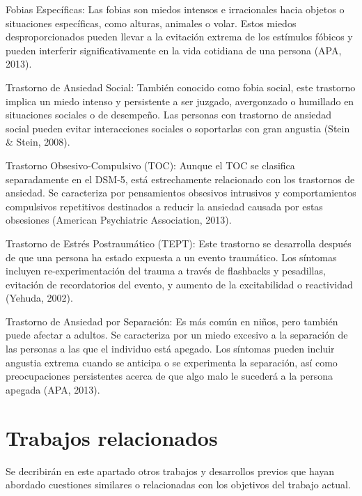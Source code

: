Fobias Específicas: Las fobias son miedos intensos e irracionales hacia objetos o situaciones específicas, como alturas, animales o volar. Estos miedos desproporcionados pueden llevar a la evitación extrema de los estímulos fóbicos y pueden interferir significativamente en la vida cotidiana de una persona (APA, 2013).

Trastorno de Ansiedad Social: También conocido como fobia social, este trastorno implica un miedo intenso y persistente a ser juzgado, avergonzado o humillado en situaciones sociales o de desempeño. Las personas con trastorno de ansiedad social pueden evitar interacciones sociales o soportarlas con gran angustia (Stein \& Stein, 2008).

Trastorno Obsesivo-Compulsivo (TOC): Aunque el TOC se clasifica separadamente en el DSM-5, está estrechamente relacionado con los trastornos de ansiedad. Se caracteriza por pensamientos obsesivos intrusivos y comportamientos compulsivos repetitivos destinados a reducir la ansiedad causada por estas obsesiones (American Psychiatric Association, 2013).

Trastorno de Estrés Postraumático (TEPT): Este trastorno se desarrolla después de que una persona ha estado expuesta a un evento traumático. Los síntomas incluyen re-experimentación del trauma a través de flashbacks y pesadillas, evitación de recordatorios del evento, y aumento de la excitabilidad o reactividad (Yehuda, 2002).

Trastorno de Ansiedad por Separación: Es más común en niños, pero también puede afectar a adultos. Se caracteriza por un miedo excesivo a la separación de las personas a las que el individuo está apegado. Los síntomas pueden incluir angustia extrema cuando se anticipa o se experimenta la separación, así como preocupaciones persistentes acerca de que algo malo le sucederá a la persona apegada (APA, 2013).

\section{Trabajos relacionados}

Se decribirán en este apartado otros trabajos y desarrollos previos que hayan abordado cuestiones similares o relacionadas con los objetivos del trabajo actual.

